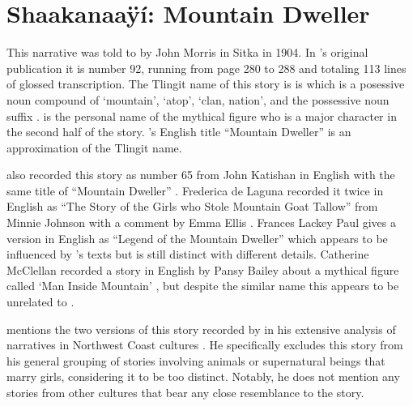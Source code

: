 
\resetexcnt
\chapter{Shaakanaaÿí: Mountain Dweller}\label{ch:92-mountain-dweller}

This narrative was told to \citeauthor{swanton:1909} by  John Morris in Sitka in 1904.
In \citeauthor{swanton:1909}’s original publication it is number 92, running from page 280 to 288 and totaling 113 lines of glossed transcription.
The Tlingit name of this story is is  which is a posessive noun compound of  ‘mountain’,  ‘atop’,  ‘clan, nation’, and the possessive noun suffix .
 is the personal name of the mythical figure who is a major character in the second half of the story.
\citeauthor{swanton:1909}’s English title “Mountain Dweller” is an approximation of the Tlingit name.

\citeauthor{swanton:1909} also recorded this story as number 65 from  John Katishan in English with the same title of “Mountain Dweller” \parencite[222–224]{swanton:1909}.
Frederica de Laguna recorded it twice in English as “The Story of the Girls who Stole Mountain Goat Tallow” from  Minnie Johnson with a comment by  Emma Ellis \parencite[892–893]{de-laguna:1972}.
Frances Lackey Paul  gives a version in English as “Legend of the Mountain Dweller” \parencite[70–71]{paul:1944} which appears to be influenced by \citeauthor{swanton:1909}’s texts but is still distinct with different details.
Catherine McClellan recorded a story in English by  Pansy Bailey about a mythical figure called  ‘Man Inside Mountain’ \parencite[692–695]{mcclellan-cruikshank:2007c}, but despite the similar name this appears to be unrelated to .

\citeauthor{boas:1916} mentions the two versions of this story recorded by \citeauthor{swanton:1909} in his extensive analysis of narratives in Northwest Coast cultures \parencite[758]{boas:1916}.
He specifically excludes this story from his general grouping of stories involving animals or supernatural beings that marry girls, considering it to be too distinct.
Notably, he does not mention any stories from other cultures that bear any close resemblance to the  story.

